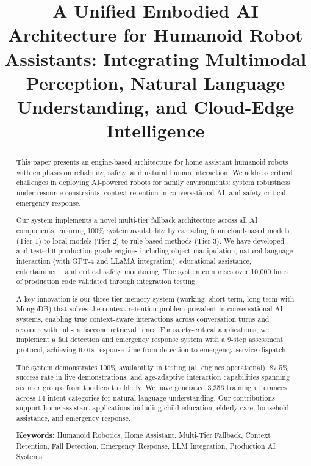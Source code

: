 \documentclass[conference]{IEEEtran}
\title{A Unified Embodied AI Architecture for Humanoid Robot Assistants: Integrating Multimodal Perception, Natural Language Understanding, and Cloud-Edge Intelligence}
\author{
\IEEEauthorblockN{Victor Ibhafidon}
\IEEEauthorblockA{\textit{Xtainless Technologies} \\
Email: info@xtainlesstech.com}
}
\begin{document}
\maketitle

\begin{abstract}

This paper presents an engine-based architecture for home assistant humanoid robots with emphasis on reliability, safety, and natural human interaction. We address critical challenges in deploying AI-powered robots for family environments: system robustness under resource constraints, context retention in conversational AI, and safety-critical emergency response.

Our system implements a novel multi-tier fallback architecture across all AI components, ensuring 100\% system availability by cascading from cloud-based models (Tier 1) to local models (Tier 2) to rule-based methods (Tier 3). We have developed and tested 9 production-grade engines including object manipulation, natural language interaction (with GPT-4 and LLaMA integration), educational assistance, entertainment, and critical safety monitoring. The system comprises over 10,000 lines of production code validated through integration testing.

A key innovation is our three-tier memory system (working, short-term, long-term with MongoDB) that solves the context retention problem prevalent in conversational AI systems, enabling true context-aware interactions across conversation turns and sessions with sub-millisecond retrieval times. For safety-critical applications, we implement a fall detection and emergency response system with a 9-step assessment protocol, achieving 6.01s response time from detection to emergency service dispatch.

The system demonstrates 100\% availability in testing (all engines operational), 87.5\% success rate in live demonstrations, and age-adaptive interaction capabilities spanning six user groups from toddlers to elderly. We have generated 3,356 training utterances across 14 intent categories for natural language understanding. Our contributions support home assistant applications including child education, elderly care, household assistance, and emergency response.

\textbf{Keywords:} Humanoid Robotics, Home Assistant, Multi-Tier Fallback, Context Retention, Fall Detection, Emergency Response, LLM Integration, Production AI Systems
\end{abstract}
\end{document}
